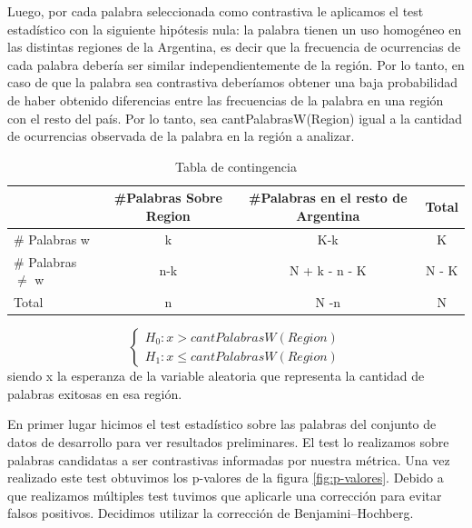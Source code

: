 Luego, por cada palabra seleccionada como contrastiva le aplicamos el test estadístico con la siguiente hipótesis nula: la palabra tienen un uso homogéneo en las distintas regiones de la Argentina, es decir que la frecuencia de ocurrencias de cada palabra debería ser similar independientemente de la región.
Por lo tanto, en caso de que la palabra sea contrastiva deberíamos obtener una baja probabilidad de haber obtenido diferencias entre las frecuencias de la palabra en una región con el resto del país.  
Por lo tanto, sea  cantPalabrasW(Region) igual a la cantidad de ocurrencias observada de la palabra en la región a analizar.


\begin{table}[ht]
\centering
\label{tab:contingencia}
\begin{tabular}{lccc}
\hline
& \#Palabras Sobre Region &\#Palabras en el resto de Argentina &Total \\ \hline
\# Palabras w &   k & K-k & K \\ 
\# Palabras $\neq$ w & n-k & N + k - n - K  & N - K \\ 
Total & n & N -n & N \\ \hline
\end{tabular}
\caption{Tabla de contingencia}

\end{table}



$$
\begin{cases}
H_0 :  x > cantPalabrasW(Region) \\
H_1 : x \leq cantPalabrasW(Region)
\end{cases}
$$  
siendo x la esperanza de la variable aleatoria que representa la cantidad de palabras exitosas en esa región.

En primer lugar hicimos el test estadístico sobre las palabras del conjunto de datos de desarrollo para ver resultados preliminares. El test lo realizamos sobre palabras candidatas a ser contrastivas informadas por nuestra métrica. Una vez realizado este test obtuvimos los p-valores de la figura \ref{fig:p-valores}. Debido a que realizamos múltiples test tuvimos que aplicarle una corrección para evitar falsos positivos. Decidimos utilizar la corrección de Benjamini–Hochberg.


